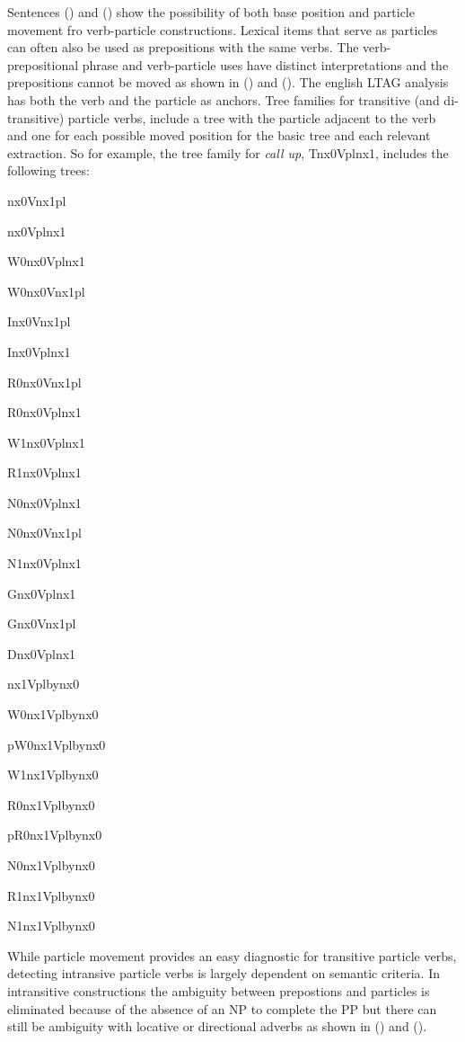 Sentences () and () show the possibility of both base position and particle movement fro verb-particle constructions. Lexical items that serve
as particles can often also be used as prepositions with the same verbs. The verb-prepositional phrase  and verb-particle uses
have distinct interpretations and the prepositions cannot be moved as
shown in () and (). The english LTAG analysis has both the verb and the
particle as anchors. Tree families for transitive (and
di-transitive) particle verbs, include a tree with the particle
adjacent to the verb and one for each possible moved position for the
basic tree and each relevant extraction. So for example, the tree family for {\it call
up}, Tnx0Vplnx1, includes the following trees:
\begin{description}
\item nx0Vnx1pl
\item nx0Vplnx1
\item W0nx0Vplnx1
\item W0nx0Vnx1pl
\item Inx0Vnx1pl
\item Inx0Vplnx1
\item R0nx0Vnx1pl
\item R0nx0Vplnx1
\item W1nx0Vplnx1
\item R1nx0Vplnx1
\item N0nx0Vplnx1
\item N0nx0Vnx1pl
\item N1nx0Vplnx1
\item Gnx0Vplnx1
\item Gnx0Vnx1pl
\item Dnx0Vplnx1
\item nx1Vplbynx0
\item W0nx1Vplbynx0
\item pW0nx1Vplbynx0
\item W1nx1Vplbynx0
\item R0nx1Vplbynx0
\item pR0nx1Vplbynx0
\item N0nx1Vplbynx0
\item R1nx1Vplbynx0
\item N1nx1Vplbynx0
\end{description}

While particle movement provides an easy diagnostic for transitive
particle verbs, detecting intransive particle verbs is largely
dependent on semantic criteria. In intransitive constructions the
ambiguity between prepostions and particles is eliminated because of
the absence of an NP to complete the PP but there can still be ambiguity
with locative or directional adverbs as shown in () and ().   

